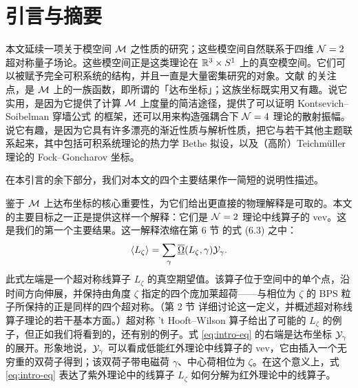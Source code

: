 
\section{引言与摘要}
\label{sec:IntroductionAndSummary}

本文延续一项关于模空间 $\mathcal{M}$ 之性质的研究\cite{Gaiotto:2008cd,Gaiotto:2009hg}；这些模空间自然联系于四维 $\mathcal{N}=2$ 超对称量子场论\cite{Seiberg:1994rs,Seiberg:1996nz}。这些模空间正是这类理论在 $\mathbb{R}^3\times S^1$ 上的真空模空间。它们可以被赋予完全可积系统的结构，并且一直是大量密集研究的对象。文献 \cite{Gaiotto:2008cd,Gaiotto:2009hg} 的关注点，是 $\mathcal{M}$ 上的一族函数，即所谓的「达布坐标」；这族坐标既实用又有趣。说它实用，是因为它提供了计算 $\mathcal{M}$ 上\hk 度量的简洁途径，提供了可以证明 Kontsevich--Soibelman 穿墙公式\cite{ks1} 的框架，还可以用来构造强耦合下 $\mathcal{N}=4$ 理论的散射振幅\cite{Alday:2009yn,Alday:2009dv}。说它有趣，是因为它具有许多漂亮的渐近性质与解析性质，把它与若干其他主题联系起来，其中包括可积系统理论的热力学 Bethe 拟设，以及（高阶）Teichm\"uller 理论的 Fock--Goncharov 坐标。

在本引言的余下部分，我们对本文的四个主要结果作一简短的说明性描述。

鉴于 $\mathcal{M}$ 上达布坐标的核心重要性，为它们给出更直接的物理解释是可取的。本文的主要目标之一正是提供这样一个解释：它们是 $\mathcal{N}=2$ 理论中线算子的 vev。这是我们的第一个主要结果。这一解释浓缩在第 6 节%
的式 (6.3)%
之中：
\begin{equation} \label{eq:intro-eq}
\langle L_\zeta \rangle = \sum_\gamma \overline{\underline{\Omega}}(L_\zeta, \gamma) \mathcal{Y}_\gamma.
\end{equation}
此式左端是一个超对称线算子 $L_\zeta$ 的真空期望值。该算子位于空间中的单个点，沿时间方向伸展，并保持由角度 $\zeta$ 指定的四个庞加莱超荷——与相位为 $\zeta$ 的 BPS 粒子所保持的正是同样的四个超对称。（第 2 节%
详细讨论这一定义，并概述超对称线算子理论的若干基本方面。）超对称 't Hooft--Wilson 算子给出了可能的 $L_\zeta$ 的例子，但正如我们将看到的，还有别的例子。式 \eqref{eq:intro-eq} 的右端是达布坐标 $\mathcal{Y}_\gamma$ 的展开。形象地说，$\mathcal{Y}_\gamma$ 可以看成低能红外理论中线算子的 vev，它由插入一个无穷重的双荷子得到；该双荷子带电磁荷 $\gamma$、中心荷相位为 $\zeta$。在这个意义上，式 \eqref{eq:intro-eq} 表达了紫外理论中的线算子 $L_\zeta$ 如何分解为红外理论中的线算子。

